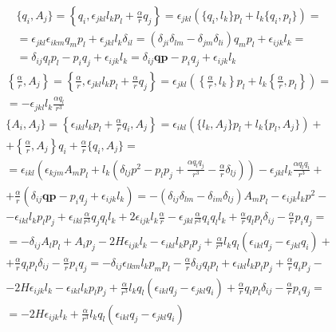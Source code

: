 \documentclass[12pt]{article}
\theoremstyle{definition}
\begin{document}
\begin{enumerate}
\begin{itemize}
\begin{itemize}
\begin{multline}
                \{q_i,A_j\}=\left\{q_i,\epsilon_{jkl}l_kp_l+\frac{\alpha}{r}q_j\right\}=\epsilon_{jkl}(\{q_i,l_k\}p_l+l_k\{q_i,p_l\})=\\=\epsilon_{jkl}\epsilon_{ikm}q_mp_l+\epsilon_{jkl}l_k\delta_{il}=(\delta_{ji}\delta_{lm}-\delta_{jm}\delta_{li})q_mp_l+\epsilon_{ijk}l_k=\\=\delta_{ij}q_lp_l-p_iq_j+\epsilon_{ijk}l_k=\delta_{ij}\bm{q}\bm{p}-p_iq_j+\epsilon_{ijk}l_k
            \end{multline}
            \begin{multline}
                \left\{\frac{\alpha}{r},A_j\right\}=\left\{\frac{\alpha}{r},\epsilon_{jkl}l_kp_l+\frac{\alpha}{r}q_j\right\}=\epsilon_{jkl}\left(\left\{\frac{\alpha}{r},l_k\right\}p_l+l_k\left\{\frac{\alpha}{r},p_l\right\}\right)=\\=-\epsilon_{jkl}l_k\frac{\alpha q_l}{r^3}
            \end{multline}
            \begin{multline}
                \{A_i,A_j\}=\left\{\epsilon_{ikl}l_kp_l+\frac{\alpha}{r}q_i,A_j\right\}=\epsilon_{ikl}(\{l_k,A_j\}p_l+l_k\{p_l,A_j\})+\\+\left\{\frac{\alpha}{r},A_j\right\}q_i+\frac{\alpha}{r}\{q_i,A_j\}=\\=\epsilon_{ikl}\left(\epsilon_{kjm}A_mp_l+l_k\left(\delta_{lj}p^2-p_lp_j+\frac{\alpha q_lq_j}{r^3}-\frac{\alpha}{r}\delta_{lj}\right)\right)-\epsilon_{jkl}l_k\frac{\alpha q_lq_i}{r^3}+\\+\frac{\alpha}{r}(\delta_{ij}\bm{q}\bm{p}-p_iq_j+\epsilon_{ijk}l_k)=-(\delta_{ij}\delta_{lm}-\delta_{im}\delta_{lj})A_mp_l-\epsilon_{ijk}l_kp^2-\\-\epsilon_{ikl}l_kp_lp_j+\epsilon_{ikl}\frac{\alpha}{r^3}q_jq_ll_k+2\epsilon_{ijk}l_k\frac{\alpha}{r}-\epsilon_{jkl}\frac{\alpha}{r^3}q_iq_ll_k+\frac{\alpha}{r}q_lp_l\delta_{ij}-\frac{\alpha}{r}p_iq_j=\\=-\delta_{ij}A_lp_l+A_ip_j-2H\epsilon_{ijk}l_k-\epsilon_{ikl}l_kp_lp_j+\frac{\alpha}{r^3}l_kq_l(\epsilon_{ikl}q_j-\epsilon_{jkl}q_i)+\\+\frac{\alpha}{r}q_lp_l\delta_{ij}-\frac{\alpha}{r}p_iq_j=-\delta_{ij}\epsilon_{lkm}l_kp_mp_l-\frac{\alpha}{r}\delta_{ij}q_lp_l+\epsilon_{ikl}l_kp_lp_j+\frac{\alpha}{r}q_ip_j-\\-2H\epsilon_{ijk}l_k-\epsilon_{ikl}l_kp_lp_j+\frac{\alpha}{r^3}l_kq_l(\epsilon_{ikl}q_j-\epsilon_{jkl}q_i)+\frac{\alpha}{r}q_lp_l\delta_{ij}-\frac{\alpha}{r}p_iq_j=\\=-2H\epsilon_{ijk}l_k+\frac{\alpha}{r^3}l_kq_l(\epsilon_{ikl}q_j-\epsilon_{jkl}q_i)

\end{multline}
\end{itemize}
\end{itemize}
\end{enumerate}
\end{document}

